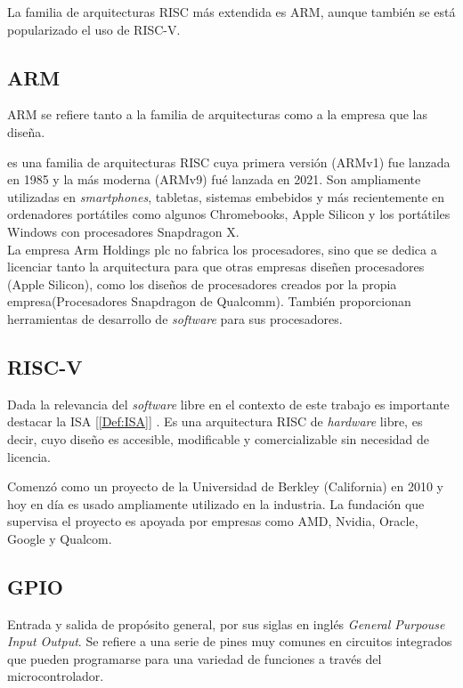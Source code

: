 La familia de arquitecturas RISC más extendida es ARM, aunque también se está popularizado el uso de RISC-V.

\subsection{ARM}
ARM se refiere tanto a la familia de arquitecturas como a la empresa que las diseña.

 es una familia de arquitecturas RISC cuya primera versión (ARMv1) fue lanzada en 1985 y la más moderna (ARMv9) fué lanzada en 2021. Son ampliamente utilizadas en \emph{smartphones}, tabletas, sistemas embebidos y más recientemente en ordenadores portátiles como algunos Chromebooks, Apple Silicon y los portátiles Windows con procesadores Snapdragon X.\\

La empresa Arm Holdings plc no fabrica los procesadores, sino que se dedica a licenciar tanto la arquitectura para que otras empresas diseñen procesadores (Apple Silicon), como los diseños de procesadores creados por la propia empresa(Procesadores Snapdragon de Qualcomm). También proporcionan herramientas de desarrollo de \emph{software} para sus procesadores.

\subsection{RISC-V}
Dada la relevancia del \emph{software} libre en el contexto de este trabajo es importante destacar la ISA [\ref{Def:ISA}] . Es una arquitectura RISC de \emph{hardware} libre, es decir, cuyo diseño es accesible, modificable y comercializable sin necesidad de licencia.

Comenzó como un proyecto de la Universidad de Berkley (California) en 2010 y hoy en día es usado ampliamente utilizado en la industria. La fundación que supervisa el proyecto es apoyada por empresas como AMD, Nvidia, Oracle, Google y Qualcom. \cite{RISC-V_BOOK}

\subsection{GPIO}
Entrada y salida de propósito general,  por sus siglas en inglés \emph{General Purpouse Input Output}. Se refiere a una serie de pines muy comunes en circuitos integrados que pueden programarse para una variedad de funciones a través del microcontrolador. 


